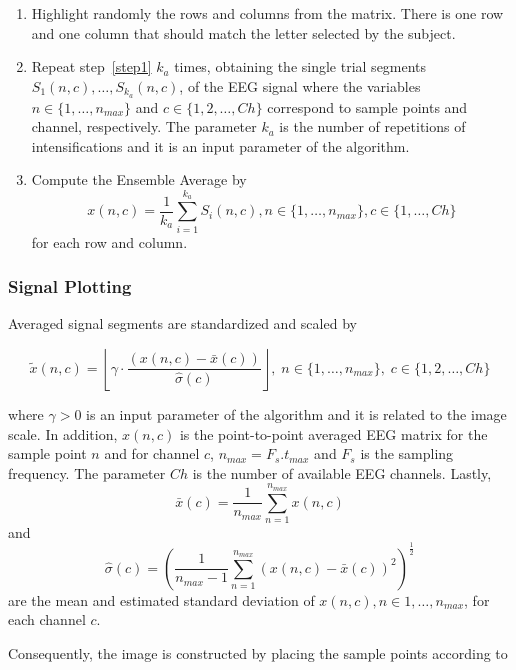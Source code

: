 \documentclass[utf8]{frontiersSCNS} %
\begin{document}
\begin{enumerate}
\item \label{step1}Highlight randomly the rows and columns from the matrix.  There is one row and one column that should match the letter selected by the subject.
\item  \label{step2} Repeat step~\ref{step1} $k_a$ times, obtaining the single trial segments $S_1(n,c),\dots,S_{k_a}(n,c)$, of the EEG signal where the variables $n \in \{1, \dots, n_{max}\}$ and $c \in \{1,2,\dots,Ch\}$ correspond to sample points and channel, respectively. The parameter $k_a$ is the number of repetitions of intensifications and it is an input parameter of the algorithm.
\item \label{step3} Compute the Ensemble Average by
\begin{equation}
x(n,c)= \frac{1}{k_a}\sum_{i=1}^{k_a}S_i(n,c),n \in \{1, \dots, n_{max}\}, c \in \{1,\dots,Ch\}
\label{averaging}
\end{equation}  
for each row and column. 
\end{enumerate}

\subsubsection{Signal Plotting} \label{Plot}

Averaged signal segments are standardized and scaled by 

\begin{equation}
\tilde{x}(n,c) = \left \lfloor{ \gamma \cdot \frac{( x(n,c) - \bar{x}(c)  )}{ \hat{\sigma}(c) } }\right \rfloor, \; n \in \{ 1, \dots, n_{max}\},\; c \in \{1,2,\dots,Ch\}
\label{eq:standarizedaverages}
\end{equation}

\noindent where $\gamma > 0$ is an input parameter of the algorithm and  it is related to the image scale. In addition, $ x(n,c) $ is the point-to-point averaged EEG matrix for the sample point $n$ and for channel $c$, $n_{max}=F_s.t_{max}$ and $F_s$ is the sampling frequency. The parameter  $Ch$ is the number of available EEG channels. Lastly, $$\bar{x}(c) =\frac{1}{n_{max}}\sum_{n=1}^{n_{max}}x(n,c)$$ and $$ \hat{\sigma}(c) = (\frac{1}{n_{max}-1}\sum_{n=1}^{n_{max}}(x(n,c)-\bar{x}(c))^2 )^{\frac{1}{2}}$$ are the mean and estimated standard deviation of $x(n,c), n \in 1,\dots,n_{max}$, for each channel $c$.

Consequently, the image is constructed by placing the sample points according to
\end{document}

